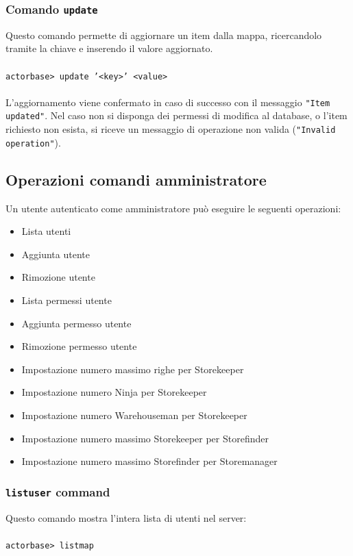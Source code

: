 \documentclass[a4paper]{article}
\begin{document}
	\subsubsection{Comando \texttt{update}}
	Questo comando permette di aggiornare un item dalla mappa, ricercandolo tramite la chiave e inserendo il valore aggiornato.
	\\ \\
	\texttt{actorbase>	update '<key>' <value>}
	\\ \\
	L'aggiornamento viene confermato in caso di successo con il messaggio \texttt{"Item updated"}. Nel caso non si disponga dei permessi di modifica al database, o l'item 
	richiesto non esista, si riceve un messaggio di operazione non valida (\texttt{"Invalid operation"}).
	
	\subsection{Operazioni comandi amministratore}
	Un utente autenticato come amministratore può eseguire le seguenti operazioni:
	\begin{itemize}
		\item Lista utenti
		\item Aggiunta utente
		\item Rimozione utente
		\item Lista permessi utente
		\item Aggiunta permesso utente
		\item Rimozione permesso utente
		\item Impostazione numero massimo righe per Storekeeper
		\item Impostazione numero Ninja per Storekeeper
		\item Impostazione numero Warehouseman per Storekeeper
		\item Impostazione numero massimo Storekeeper per Storefinder
		\item Impostazione numero massimo Storefinder per Storemanager
	\end{itemize}

	\subsubsection{\texttt{listuser} command}
	Questo comando mostra l'intera lista di utenti nel server:
	\\ \\
	\texttt{actorbase>	listmap}
\end{document}
